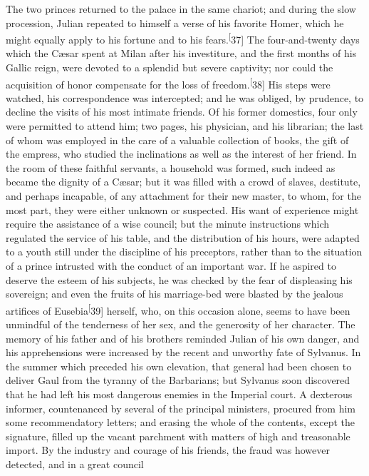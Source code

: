 The two princes returned to the palace in the same chariot; and
during the slow procession, Julian repeated to himself a verse of
his favorite Homer, which he might equally apply to his fortune
and to his fears.\textsuperscript[37] The four-and-twenty days which the Cæsar
spent at Milan after his investiture, and the first months of his
Gallic reign, were devoted to a splendid but severe captivity;
nor could the acquisition of honor compensate for the loss of
freedom.\textsuperscript[38] His steps were watched, his correspondence was
intercepted; and he was obliged, by prudence, to decline the
visits of his most intimate friends. Of his former domestics,
four only were permitted to attend him; two pages, his physician,
and his librarian; the last of whom was employed in the care of a
valuable collection of books, the gift of the empress, who
studied the inclinations as well as the interest of her friend.
In the room of these faithful servants, a household was formed,
such indeed as became the dignity of a Cæsar; but it was filled
with a crowd of slaves, destitute, and perhaps incapable, of any
attachment for their new master, to whom, for the most part, they
were either unknown or suspected. His want of experience might
require the assistance of a wise council; but the minute
instructions which regulated the service of his table, and the
distribution of his hours, were adapted to a youth still under
the discipline of his preceptors, rather than to the situation of
a prince intrusted with the conduct of an important war. If he
aspired to deserve the esteem of his subjects, he was checked by
the fear of displeasing his sovereign; and even the fruits of his
marriage-bed were blasted by the jealous artifices of Eusebia\textsuperscript[39]
herself, who, on this occasion alone, seems to have been
unmindful of the tenderness of her sex, and the generosity of her
character. The memory of his father and of his brothers reminded
Julian of his own danger, and his apprehensions were increased by
the recent and unworthy fate of Sylvanus. In the summer which
preceded his own elevation, that general had been chosen to
deliver Gaul from the tyranny of the Barbarians; but Sylvanus
soon discovered that he had left his most dangerous enemies in
the Imperial court. A dexterous informer, countenanced by several
of the principal ministers, procured from him some recommendatory
letters; and erasing the whole of the contents, except the
signature, filled up the vacant parchment with matters of high
and treasonable import. By the industry and courage of his
friends, the fraud was however detected, and in a great council
